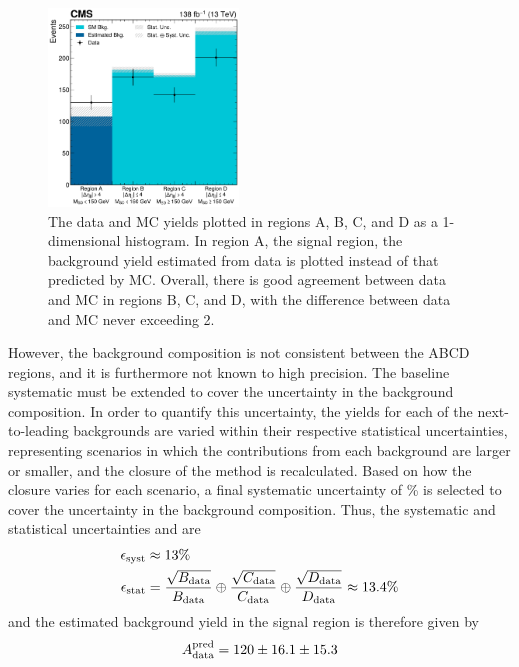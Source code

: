 \begin{figure}[htb]
    \centering
    \includegraphics[width=0.45\textwidth]{fig/vbswh/regionsABCD_closure_unblinded.pdf}
    \caption[The data and MC yields plotted in regions A, B, C, and D as a 1-dimensional histogram]{
        The data and MC yields plotted in regions A, B, C, and D as a 1-dimensional histogram. 
        In region A, the signal region, the background yield estimated from data is plotted instead of that predicted by MC. 
        Overall, there is good agreement between data and MC in regions B, C, and D, with the difference between data and MC never exceeding 2\std. 
    }
    \label{fig:vbswh_abcd_closure}
\end{figure}
However, the background composition is not consistent between the ABCD regions, and it is furthermore not known to high precision. 
The baseline systematic must be extended to cover the uncertainty in the background composition. 
In order to quantify this uncertainty, the yields for each of the next-to-leading backgrounds are varied within their respective statistical uncertainties, representing scenarios in which the contributions from each background are larger or smaller, and the closure of the method is recalculated. 
Based on how the closure varies for each scenario, a final systematic uncertainty of \BkgEstTotalSystErr\% is selected to cover the uncertainty in the background composition. 
Thus, the systematic and statistical uncertainties \Esyst and \Estat are
\begin{align*}
    \epsilon_{\text{syst}} &\approx 13\% \\
    \epsilon_{\text{stat}} &= \frac{\sqrt{B_{\text{data}}}}{B_{\text{data}}} \oplus \frac{\sqrt{C_{\text{data}}}}{C_{\text{data}}} \oplus \frac{\sqrt{D_{\text{data}}}}{D_{\text{data}}} \approx 13.4\%
\end{align*}
and the estimated background yield in the signal region is therefore given by 
\begin{equation*}
    A_{\text{data}}^\text{pred} = 120 \pm 16.1 \pm 15.3
\end{equation*}

